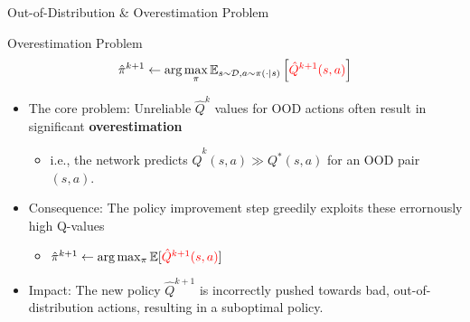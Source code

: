 \documentclass[11pt]{beamer}
\newcommand{\mbb}[1]{\mathbb{#1}}
\newcommand{\mc}[1]{\mathcal{#1}}
\newcommand{\tb}[1]{\textbf{#1}}
\begin{document}
\begin{frame}{Out-of-Distribution \& Overestimation Problem}
    \begin{block}{Overestimation Problem}
        \[
            \hat{\pi}^{k+1}  \leftarrow \arg \max_\pi \mbb{E}_{s \sim \mc{D}, a \sim \pi(\cdot|s)} \left[ \textcolor{red}{\hat{Q}^{k+1}(s,a)} \right]
        \]
    \begin{itemize}
        \item The core problem: Unreliable $\hat{Q}^k$ values for OOD actions often result in significant \tb{overestimation}
        \begin{itemize}
            \item i.e., the network predicts $\hat{Q}^k(s,a) \gg Q^*(s,a)$ for an OOD pair $(s,a)$.
        \end{itemize}
        \item Consequence: The policy improvement step greedily exploits these errornously high Q-values
        \begin{itemize}
            \item $\hat{\pi}^{k+1} \leftarrow \arg \max_{\pi} \mbb{E}[\textcolor{red}{\hat{Q}^{k+1}(s,a)}]$
        \end{itemize}
        \item Impact: The new policy $\hat{Q}^{k+1}$ is incorrectly pushed towards bad, out-of-distribution actions, resulting in a suboptimal policy.
    \end{itemize}
    \end{block}
\end{frame}
\end{document}
